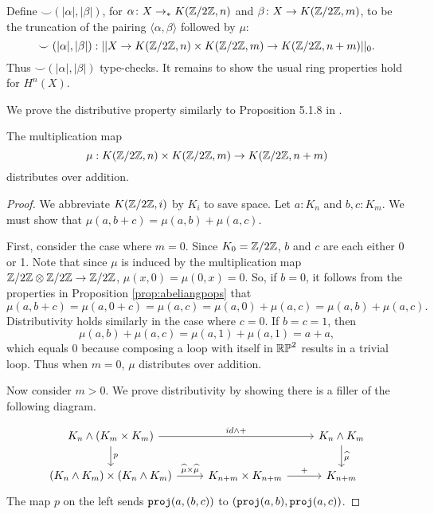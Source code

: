 \documentclass{amsart}
\begin{document}
Define
$ \smile ( |\alpha|, |\beta|)  $, for
$ \alpha \colon X \to_\ast K(\mathbb{Z}/2\mathbb{Z},n) $ and
$ \beta \colon X \to K(\mathbb{Z}/2\mathbb{Z},m) $, to be the truncation of the
pairing $ \langle \alpha, \beta \rangle $ followed by $ \mu $:
\[
\smile ( |\alpha|, |\beta|)  :
|| X \to K(\mathbb{Z}/2\mathbb{Z},n) \times K(\mathbb{Z}/2\mathbb{Z},m) \to K(\mathbb{Z}/2\mathbb{Z},n+m) ||_0.
\]
Thus $ \smile ( |\alpha|, |\beta| ) $ type-checks. It
remains to show the usual ring properties hold for $ H^n(X)
$.  

We prove the distributive property similarly to Proposition 5.1.8 in \cite{brunerie:thesis}.
\begin{proposition}
	The multiplication map \[{\mu}:K(\mathbb{Z}/2\mathbb{Z},n)\times K(\mathbb{Z}/2\mathbb{Z},m)\to K(\mathbb{Z}/2\mathbb{Z},n+m)\] distributes over addition.
	\end{proposition}

\begin{proof} We abbreviate $K(\mathbb{Z}/2\mathbb{Z},i)$ by $K_i$ to save space. Let $a:K_n$ and $b,c:K_m$. We must show that $\mu(a,b+c)=\mu(a,b)+\mu(a,c)$. 
	
	First, consider the case where $m=0$. Since $K_0=\mathbb{Z}/2\mathbb{Z}$, $b$ and $c$ are each either 0 or 1. Note that since $\mu$ is induced by the multiplication map $\mathbb{Z}/2\mathbb{Z}\otimes\mathbb{Z}/2\mathbb{Z}\to\mathbb{Z}/2\mathbb{Z}$, $\mu(x,0)=\mu(0,x)=0$. So, if $b=0$, it follows from the properties in Proposition \ref{prop:abeliangpops} that \[\mu(a,b+c)=\mu(a,0+c)=\mu(a,c)=\mu(a,0)+\mu(a,c)=\mu(a,b)+\mu(a,c).\]
	Distributivity holds similarly in the case where $c=0$. If $b=c=1$, then
	\[\mu(a,b)+\mu(a,c)=\mu(a,1)+\mu(a,1)=a+a,\]
	which equals 0 because composing a loop with itself in $\mathbb{RP}^2$ results in a trivial loop. Thus when $m=0$, $\mu$ distributes over addition.
	
	Now consider $m>0$. We prove distributivity by showing there is a filler of the following diagram.
	
	\[\begin{tikzcd}
	K_n\wedge\left(K_m\times K_m\right) \arrow[rr,"id\wedge+"] \arrow[d,"p"]&  & K_n\wedge K_m\arrow[d,"\widehat{\mu}"]\\
	\left(K_n\wedge K_m\right)\times\left(K_n\wedge K_m\right)\arrow[r,"\widehat{\mu}\times\widehat{\mu}"] & K_{n+m}\times K_{n+m}\arrow[r,"+"] &K_{n+m}	
	\end{tikzcd}\]
	The map $p$ on the left sends $\mathtt{proj}(a,(b,c))$ to $(\mathtt{proj}(a,b),\mathtt{proj}(a,c))$. 
	
	

\end{proof}
\end{document}
